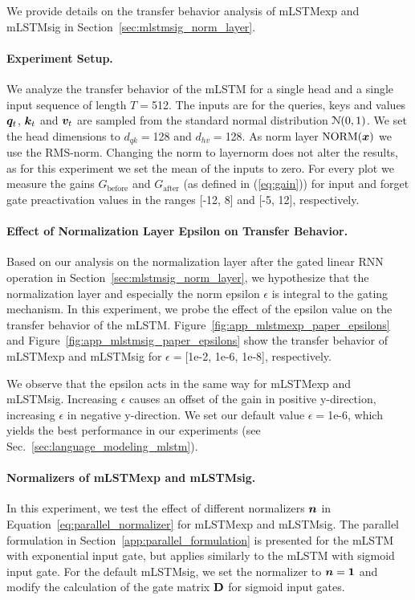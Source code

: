 \documentclass{article}
\begin{document}
    We provide details on the transfer behavior analysis of mLSTMexp and mLSTMsig in Section~\ref{sec:mlstmsig_norm_layer}.

    \paragraph{Experiment Setup.}
    We analyze the transfer behavior of the mLSTM for a single head and a single input sequence of length $T=$512.
    The inputs are for the queries, keys and values $\bm{q}_t$, $\bm{k}_t$ and $\bm{v}_t$ are sampled from the standard normal distribution $\mathcal{N}(0,1)$.
    We set the head dimensions to $d_{qk}=$128 and $d_{hv}=$128.
    As norm layer $\mathrm{NORM}(\bm{x})$ we use the RMS-norm.
    Changing the norm to layernorm does not alter the results, as for this experiment we set the mean of the inputs to zero.
    For every plot we measure the gains $G_\mathrm{before}$ and $G_\mathrm{after}$ (as defined in (\ref{eq:gain})) for input and forget gate preactivation values in the ranges [-12, 8] and [-5, 12], respectively.

    \paragraph{Effect of Normalization Layer Epsilon on Transfer Behavior.}
    Based on our analysis on the normalization layer after the gated linear RNN operation in Section~\ref{sec:mlstmsig_norm_layer}, we hypothesize that the normalization layer and especially the norm epsilon $\epsilon$ is integral to the gating mechanism.
    In this experiment, we probe the effect of the epsilon value on the transfer behavior of the mLSTM.
    Figure~\ref{fig:app_mlstmexp_paper_epsilons} and Figure~\ref{fig:app_mlstmsig_paper_epsilons} show the transfer behavior of mLSTMexp and mLSTMsig for $\epsilon=$[1e-2, 1e-6, 1e-8], respectively.

    We observe that the epsilon acts in the same way for mLSTMexp and mLSTMsig.
    Increasing $\epsilon$ causes an offset of the gain in positive y-direction, increasing $\epsilon$ in negative y-direction.
    We set our default value $\epsilon=$1e-6, which yields the best performance in our experiments (see Sec.~\ref{sec:language_modeling_mlstm}).

    \paragraph{Normalizers of mLSTMexp and mLSTMsig.}
    In this experiment, we test the effect of different normalizers $\bm{n}$ in Equation~\ref{eq:parallel_normalizer} for mLSTMexp and mLSTMsig.
    The parallel formulation in Section~\ref{app:parallel_formulation} is presented for the mLSTM with exponential input gate, but applies similarly to the mLSTM with sigmoid input gate.
    For the default mLSTMsig, we set the normalizer to $\bm{n}=\bm{1}$ and modify the calculation of the gate matrix $\bm{\mathrm{D}}$ for sigmoid input gates.
\end{document}
